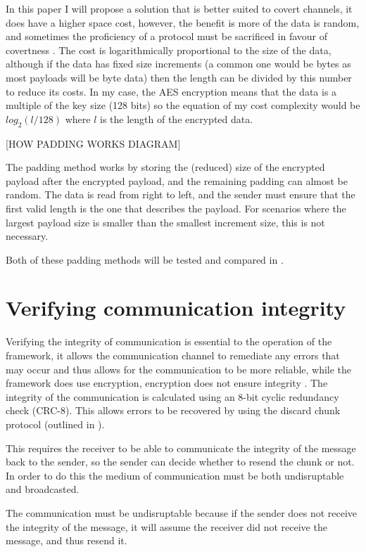 In this paper I will propose a solution that is better suited to covert channels, it does have a higher space cost, however, the benefit is more of the data is random, and sometimes the proficiency of a protocol must be sacrificed in favour of covertness \cite{oCDCCEDNA}. The cost is logarithmically proportional to the size of the data, although if the data has fixed size increments (a common one would be bytes as most payloads will be byte data) then the length can be divided by this number to reduce its costs. In my case, the AES encryption means that the data is a multiple of the key size (128 bits) so the equation of my cost complexity would be $log_2(l/128)$ where $l$ is the length of the encrypted data.

[HOW PADDING WORKS DIAGRAM]

The padding method works by storing the (reduced) size of the encrypted payload after the encrypted payload, and the remaining padding can almost be random. The data is read from right to left, and the sender must ensure that the first valid length is the one that describes the payload. For scenarios where the largest payload size is smaller than the smallest increment size, this is not necessary.

Both of these padding methods will be tested and compared in .

\section{Verifying communication integrity}
\label{sec:integrity}

Verifying the integrity of communication is essential to the operation of the framework, it allows the communication channel to remediate any errors that may occur and thus allows for the communication to be more reliable, while the framework does use encryption, encryption does not ensure integrity \cite{GUCCA}. The integrity of the communication is calculated using an 8-bit cyclic redundancy check (CRC-8). This allows errors to be recovered by using the discard chunk protocol (outlined in ).

This requires the receiver to be able to communicate the integrity of the message back to the sender, so the sender can decide whether to resend the chunk or not. In order to do this the medium of communication must be both undisruptable and broadcasted.

The communication must be undisruptable because if the sender does not receive the integrity of the message, it will assume the receiver did not receive the message, and thus resend it.

